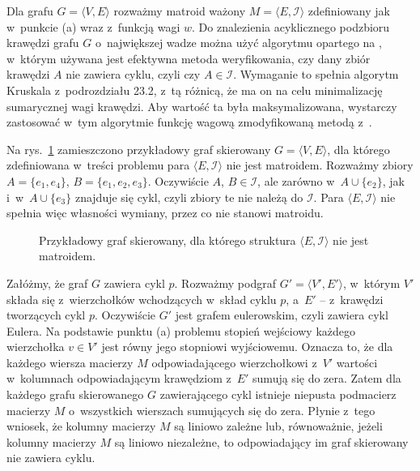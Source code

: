 \subproblem %
Dla grafu $G=\langle V,E\rangle$ rozważmy matroid ważony $M=\langle E,\mathcal{I}\rangle$ zdefiniowany jak w~punkcie (a) wraz z~funkcją wagi $w$.
Do znalezienia acyklicznego podzbioru krawędzi grafu $G$ o~największej wadze można użyć algorytmu opartego na , w~którym używana jest efektywna metoda weryfikowania, czy dany zbiór krawędzi $A$ nie zawiera cyklu, czyli czy $A\in\mathcal{I}$.
Wymaganie to spełnia algorytm Kruskala z~podrozdziału 23.2, z~tą różnicą, że ma on na celu minimalizację sumarycznej wagi krawędzi.
Aby wartość ta była maksymalizowana, wystarczy zastosować w~tym algorytmie funkcję wagową zmodyfikowaną metodą z~.

\subproblem %
Na rys.\ \ref{fig:16-3c} zamieszczono przykładowy graf skierowany $G=\langle V,E\rangle$, dla którego zdefiniowana w~treści problemu para $\langle E,\mathcal{I}\rangle$ nie jest matroidem.
Rozważmy zbiory $A=\{e_1,e_4\}$, $B=\{e_1,e_2,e_3\}$.
Oczywiście $A$, $B\in\mathcal{I}$, ale zarówno w~$A\cup\{e_2\}$, jak i~w~$A\cup\{e_3\}$ znajduje się cykl, czyli zbiory te nie należą do $\mathcal{I}$.
Para $\langle E,\mathcal{I}\rangle$ nie spełnia więc własności wymiany, przez co nie stanowi matroidu.
\begin{figure}[!ht]
	\centering 
	\caption{Przykładowy graf skierowany, dla którego struktura $\langle E,\mathcal{I}\rangle$ nie jest matroidem.} \label{fig:16-3c}
\end{figure}

\subproblem %
Załóżmy, że graf $G$ zawiera cykl $p$.
Rozważmy podgraf $G'=\langle V',E'\rangle$, w~którym $V'$ składa się z~wierzchołków wchodzących w~skład cyklu $p$, a~$E'$ -- z~krawędzi tworzących cykl $p$.
Oczywiście $G'$ jest grafem eulerowskim, czyli zawiera cykl Eulera.
Na podstawie punktu (a) problemu  stopień wejściowy każdego wierzchołka $v\in V'$ jest równy jego stopniowi wyjściowemu.
Oznacza to, że dla każdego wiersza macierzy $M$ odpowiadającego wierzchołkowi z~$V'$ wartości w~kolumnach odpowiadającym krawędziom z~$E'$ sumują się do zera.
Zatem dla każdego grafu skierowanego $G$ zawierającego cykl istnieje niepusta podmacierz macierzy $M$ o~wszystkich wierszach sumujących się do zera.
Płynie z~tego wniosek, że kolumny macierzy $M$ są liniowo zależne lub, równoważnie, jeżeli kolumny macierzy $M$ są liniowo niezależne, to odpowiadający im graf skierowany nie zawiera cyklu.


